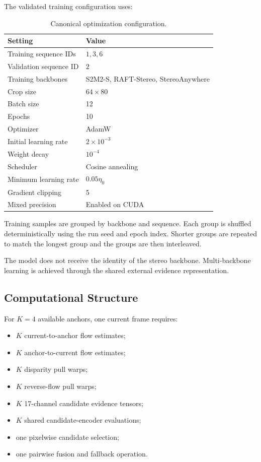\documentclass[11pt,a4paper]{article}
\begin{document}
The validated training configuration uses:

\begin{table}[t]
\centering
\caption{Canonical optimization configuration.}
\label{tab:training_configuration}
\begin{tabular}{ll}
\toprule
Setting & Value \\
\midrule
Training sequence IDs & \(1,3,6\) \\
Validation sequence ID & \(2\) \\
Training backbones
& S2M2-S, RAFT-Stereo, StereoAnywhere \\
Crop size & \(64\times80\) \\
Batch size & 12 \\
Epochs & 10 \\
Optimizer & AdamW \\
Initial learning rate & \(2\times10^{-3}\) \\
Weight decay & \(10^{-4}\) \\
Scheduler & Cosine annealing \\
Minimum learning rate & \(0.05\eta_0\) \\
Gradient clipping & 5 \\
Mixed precision & Enabled on CUDA \\
\bottomrule
\end{tabular}
\end{table}

Training samples are grouped by backbone and sequence. Each group is
shuffled deterministically using the run seed and epoch index. Shorter
groups are repeated to match the longest group and the groups are then
interleaved.

The model does not receive the identity of the stereo backbone.
Multi-backbone learning is achieved through the shared external evidence
representation.

\subsection{Computational Structure}
\label{sec:complexity}

For \(K=4\) available anchors, one current frame requires:

\begin{itemize}
    \item \(K\) current-to-anchor flow estimates;
    \item \(K\) anchor-to-current flow estimates;
    \item \(K\) disparity pull warps;
    \item \(K\) reverse-flow pull warps;
    \item \(K\) 17-channel candidate evidence tensors;
    \item \(K\) shared candidate-encoder evaluations;
    \item one pixelwise candidate selection;
    \item one pairwise fusion and fallback operation.
\end{itemize}
\end{document}
